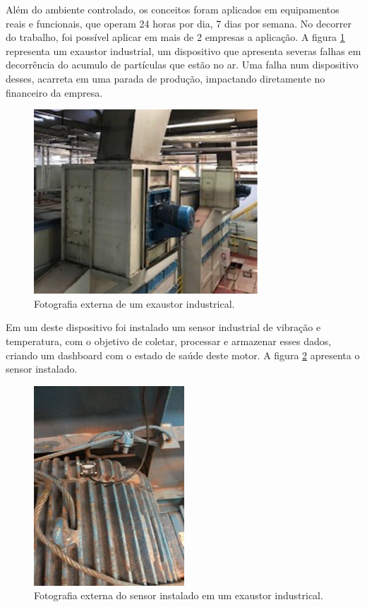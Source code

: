 Além do ambiente controlado, os conceitos foram aplicados em equipamentos reais e funcionais, que operam 24 horas por dia, 7 dias por semana. 
No decorrer do trabalho, foi possível aplicar em mais de 2 empresas a aplicação. A figura \ref{fig:exautor} representa um exaustor industrial,
um dispositivo que apresenta severas falhas em decorrência do acumulo de partículas que estão no ar. Uma falha num dispositivo desses, acarreta
em uma parada de produção, impactando diretamente no financeiro da empresa.

\begin{figure}[H]
    \caption{Fotografia externa de um exaustor industrical.}
    \begin{center}
        \includegraphics[scale=1]{metodologia/img/exaustor.png}
    \end{center}
    \label{fig:exautor}
\end{figure}

Em um deste dispositivo foi instalado um sensor industrial de vibração e temperatura, com o objetivo de coletar, processar e armazenar esses
dados, criando um dashboard com o estado de saúde deste motor. A figura \ref{fig:sensor_exaustor} apresenta o sensor instalado.

\begin{figure}[H]
    \caption{Fotografia externa do sensor instalado em um exaustor industrical.}
    \begin{center}
        \includegraphics[scale=1]{metodologia/img/sensor_exaustor.jpg}
    \end{center}
    \label{fig:sensor_exaustor}
\end{figure}


